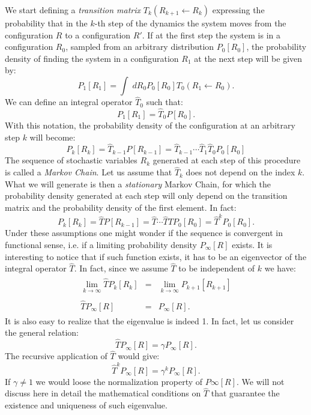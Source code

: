 We start defining a {\it transition matrix} $T_k(R_{k+1}\leftarrow R_k)$ expressing the probability that in the $k$-th step of the dynamics the system moves from the configuration $R$ to a configuration $R'$. If at the first step the system is in a configuration $R_0$, sampled from an arbitrary distribution $P_0[R_0]$, the probability density of finding the system in a configuration $R_1$ at the next step will be given by:
\begin{equation}
P_1[R_1] = \int\; dR_0 P_0[R_0]T_0(R_1\leftarrow R_0).
\end{equation}
We can define an integral operator $\hat{T}_0$ such that:
\begin{equation}
P_1[R_1]=\hat{T}_0 P[R_0].
\end{equation}
With this notation, the probability density of the configuration at an
arbitrary step $k$ will become:
\begin{equation}
P_k[R_k]=\hat{T}_{k-1} P[R_{k-1}]=\hat{T}_{k-1}\cdots\hat{T}_{1}
\hat{T}_{0} P_0[R_0]
\end{equation}
The sequence of stochastic variables $R_k$ generated at each step of this procedure is called a {\it Markov Chain}. Let us assume that $\hat{T}_k$ does not depend on the index $k$. What we will generate is then a {\it stationary} Markov Chain, for which the probability density generated at each step will only depend on the transition matrix and 
the probability density of the first element. In fact:
\begin{equation}
P_k[R_k]=\hat{T} P[R_{k-1}]=\hat{T}\cdots\hat{T}
\hat{T} P_0[R_0]=\hat{T}^kP_0[R_0].
\end{equation}
Under these assumptions one might wonder if the sequence is convergent in functional sense, i.e. if a limiting probability density $P_\infty[R]$ exists. It is interesting to notice that if such function exists, it has to be an eigenvector of the integral operator $\hat{T}$. In fact, since we assume $\hat{T}$ to be independent of $k$ we have:
\begin{eqnarray}
\begin{array}{rcl}
\lim_{k\rightarrow\infty}\hat{T}P_k[R_k]&=&\lim_{k\rightarrow\infty}P_{k+1}[R_{k+1}]\nonumber\\
\\
\hat{T}P_\infty[R]&=&P_\infty[R]\nonumber.
\end{array}
\end{eqnarray}
It is also easy to realize that the eigenvalue is indeed 1. In fact, let us consider the general relation:
\begin{equation}
\hat{T}P_\infty[R]=\gamma P_\infty[R].
\end{equation}
The recursive application of $\hat{T}$ would give:
\begin{equation}
\hat{T}^k P_\infty[R]=\gamma^kP_\infty[R].
\end{equation}
If $\gamma\neq 1$ we would loose the normalization property of $P\infty[R]$. We will not discuss here in detail the mathematical conditions on $\hat{T}$ that guarantee the existence and uniqueness of such eigenvalue.

